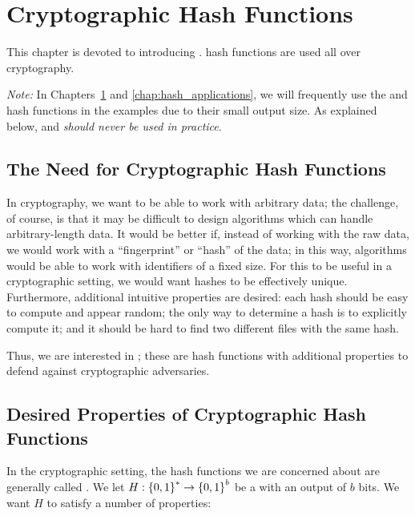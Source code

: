 \chapter{Cryptographic Hash Functions}
\label{chap:hash}

This chapter is devoted to introducing .
\Glspl{hash function} are used all over cryptography.

\emph{Note:} In Chapters~\ref{chap:hash} and \ref{chap:hash_applications},
we will frequently use the \MDFive{} and \ShaOne{} \glspl{hash function}
in the examples due to their small output size.
As explained below, \MDFive{} and \ShaOne{}
\emph{should never be used in practice}.



\section{The Need for Cryptographic Hash Functions}

In cryptography, we want to be able to work with arbitrary data;
the challenge, of course, is that it may be difficult to design
algorithms which can handle arbitrary-length data.
It would be better if, instead of working with the raw data,
we would work with a ``fingerprint'' or ``hash'' of the data;
in this way, algorithms would be able to work with identifiers
of a fixed size.
For this to be useful in a cryptographic setting,
we would want hashes to be effectively unique.
Furthermore, additional intuitive properties are desired:
each hash should be easy to compute and appear random;
the only way to determine a hash is to explicitly compute it; and
it should be hard to find two different files with the same hash.

Thus, we are interested in ;
these are hash functions with additional properties to defend against
cryptographic adversaries.



\section{Desired Properties of Cryptographic Hash Functions}
\label{sec:hash_properties}

In the cryptographic setting, the \glspl{hash function} we are concerned about
are generally called \emph{}.
We let $H:\left\{ 0,1 \right\}^{*}\to\left\{ 0,1 \right\}^{b}$ be a
 with an output of $b$ bits.
We want $H$ to satisfy a number of properties:

